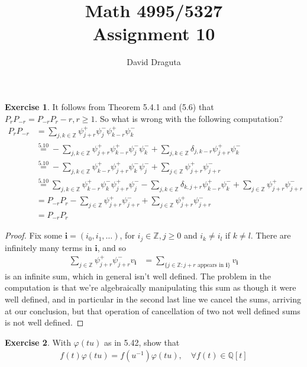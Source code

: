 \documentclass[12pt]{extarticle}
\title{ Math 4995/5327
  \\
  Assignment 10}
\author{David Draguta}
\newcommand{\set}[1]{\{#1\}}
\newcommand{\Q}{\mathbb{Q}}
\newcommand{\Z}{\mathbb{Z}}
\newcommand{\<}{\langle}
\renewcommand{\>}{\rangle}
\theoremstyle{definition}
\newtheorem{exercise}{Exercise}
\begin{document}
\maketitle

\begin{exercise}
  It follows from Theorem 5.4.1 and (5.6) that $P_{r}P_{-r} = P_{-r}P_r - r, r \geq 1.$ So what is wrong with the following computation?
  \begin{align*}
    P_r P_{-r}
    &= \sum\limits_{j,k \in \Z} \psi_{j+r}^+ \psi_{j}^-\psi_{k-r}^+\psi_k^- \\
    &\overset{5.10}{=} - \sum\limits_{j,k \in \Z} \psi_{j+r}^+\psi_{k-r}^+\psi_j^-\psi_k^- + \sum\limits_{j,k \in \Z} \delta_{j,k-r}\psi_{j+r}^+\psi_k^- \\
    &\overset{5.10}{=} - \sum\limits_{j,k \in \Z} \psi_{k-r}^+\psi_{j+r}^+\psi_k^-\psi_j^- + \sum\limits_{j \in \Z} \psi_{j+r}^+\psi_{j+r}^- \\
    &\overset{5.10}{=} \sum\limits_{j,k \in \Z} \psi_{k-r}^+\psi_{k}^-\psi_{j+r}^+\psi_j^- - \sum\limits_{j,k \in \Z} \delta_{k,j+r}\psi_{k-r}^+\psi_k^- + \sum\limits_{j \in \Z} \psi_{j+r}^+ \psi_{j+r}^- \\
    &= P_{-r}P_{r} - \sum\limits_{j \in \Z} \psi_{j +r}^+\psi_{j+r}^- + \sum\limits_{j \in \Z} \psi_{j+r}^+\psi_{j+r}^-  \\
    &= P_{-r}P_{r}
  \end{align*}
\end{exercise}
\begin{proof}
  Fix some $\mathbf{i} = (i_0, i_1, \dots)$, for $i_j \in \Z, j \geq 0$ and $i_k \neq i_l$ if $k \neq l$. There are infinitely many terms in $\mathbf{i}$, and so  
  \begin{align*}
    \sum\limits_{j \in \Z} \psi_{j +r}^+\psi_{j+r}^- v_{\mathbf{i}}
    &=
    \sum\limits_{\set{j \in \Z: j+r \text{ appears in } \mathbf{i}}} v_{\mathbf{i}} 
  \end{align*}
  is an infinite sum, which in general isn't well defined. The problem in the computation is that we're algebraically manipulating this sum as though it were well defined, and in particular in the second last line we cancel the sums, arriving at our conclusion, but that operation of cancellation of two not well defined sums is not well defined.
\end{proof}
\newpage
\begin{exercise}
  With $\varphi(tu)$ as in 5.42, show that
  \begin{align*}
    f(t)\varphi(tu) = f(u^{-1})\varphi(tu), \quad \forall f(t) \in \Q[t]
  \end{align*}
\end{exercise}
\end{document}
